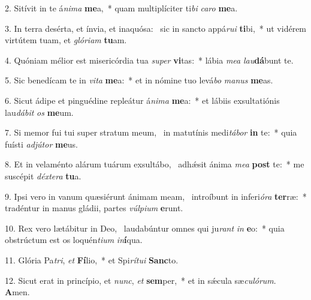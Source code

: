 2. Sitívit in te á\textit{ni}\textit{ma} \textbf{me}a,~*  quam multiplíciter ti\textit{bi} \textit{ca}\textit{ro} \textbf{me}a.\

3. In terra desérta, et ínvia, et inaquósa: \dag\  sic in sancto appá\textit{ru}\textit{i} \textbf{ti}bi,~*  ut vidérem virtútem tuam, et \textit{gló}\textit{ri}\textit{am} \textbf{tu}am.\

4. Quóniam mélior est misericórdia tua \textit{su}\textit{per} \textbf{vi}tas:~*  lábia \textit{me}\textit{a} \textit{lau}\textbf{dá}bunt te.\

5. Sic benedícam te in \textit{vi}\textit{ta} \textbf{me}a:~*  et in nómine tuo levá\textit{bo} \textit{ma}\textit{nus} \textbf{me}as.\

6. Sicut ádipe et pinguédine repleátur á\textit{ni}\textit{ma} \textbf{me}a:~*  et lábiis exsultatiónis lau\textit{dá}\textit{bit} \textit{os} \textbf{me}um.\

7. Si memor fui tui super stratum meum, \dag\  in matutínis medi\textit{tá}\textit{bor} \textbf{in} te:~*  quia fuísti \textit{ad}\textit{jú}\textit{tor} \textbf{me}us.\

8. Et in velaménto alárum tuárum exsultábo, \dag\  adhǽsit ánima \textit{me}\textit{a} \textbf{post} te:~*  me suscépit \textit{déx}\textit{te}\textit{ra} \textbf{tu}a.\

9. Ipsi vero in vanum quæsiérunt ánimam meam, \dag\  introíbunt in inferi\textit{ó}\textit{ra} \textbf{ter}ræ:~*  tradéntur in manus gládii, partes \textit{vúl}\textit{pi}\textit{um} \textbf{e}runt.\

10. Rex vero lætábitur in Deo, \dag\  laudabúntur omnes qui ju\textit{rant} \textit{in} \textbf{e}o:~*  quia obstrúctum est os loquén\textit{ti}\textit{um} \textit{in}\textbf{í}qua.\

11. Glória Pa\textit{tri}, \textit{et} \textbf{Fí}lio,~*  et Spi\textit{rí}\textit{tu}\textit{i} \textbf{Sanc}to.\

12. Sicut erat in princípio, et \textit{nunc}, \textit{et} \textbf{sem}per,~*  et in sǽcula sæ\textit{cu}\textit{ló}\textit{rum}. \textbf{A}men.\

